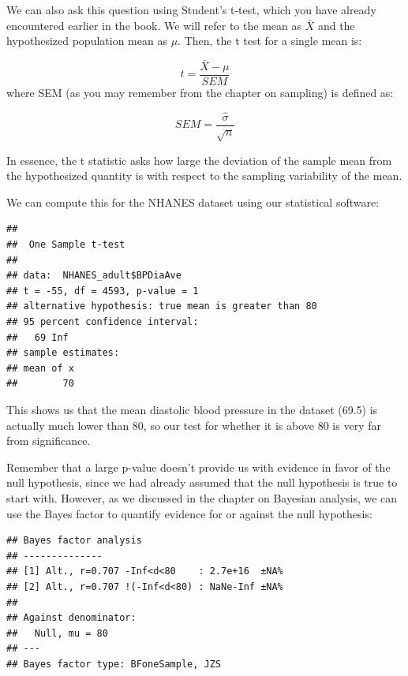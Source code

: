 \documentclass[
  12pt,
]{book}
\newenvironment{Shaded}{\begin{snugshade}}{\end{snugshade}}
\newcommand{\AttributeTok}[1]{\textcolor[rgb]{0.77,0.63,0.00}{#1}}
\newcommand{\ConstantTok}[1]{\textcolor[rgb]{0.00,0.00,0.00}{#1}}
\newcommand{\DecValTok}[1]{\textcolor[rgb]{0.00,0.00,0.81}{#1}}
\newcommand{\FunctionTok}[1]{\textcolor[rgb]{0.00,0.00,0.00}{#1}}
\newcommand{\NormalTok}[1]{#1}
\newcommand{\SpecialCharTok}[1]{\textcolor[rgb]{0.00,0.00,0.00}{#1}}
\begin{document}
We can also ask this question using Student's t-test, which you have already encountered earlier in the book. We will refer to the mean as \(\bar{X}\) and the hypothesized population mean as \(\mu\). Then, the t test for a single mean is:

\[
t = \frac{\bar{X} - \mu}{SEM}
\]
where SEM (as you may remember from the chapter on sampling) is defined as:

\[
SEM = \frac{\hat{\sigma}}{\sqrt{n}}
\]

In essence, the t statistic asks how large the deviation of the sample mean from the hypothesized quantity is with respect to the sampling variability of the mean.

We can compute this for the NHANES dataset using our statistical software:

\begin{verbatim}
## 
##  One Sample t-test
## 
## data:  NHANES_adult$BPDiaAve
## t = -55, df = 4593, p-value = 1
## alternative hypothesis: true mean is greater than 80
## 95 percent confidence interval:
##   69 Inf
## sample estimates:
## mean of x 
##        70
\end{verbatim}

This shows us that the mean diastolic blood pressure in the dataset (69.5) is actually much lower than 80, so our test for whether it is above 80 is very far from significance.

Remember that a large p-value doesn't provide us with evidence in favor of the null hypothesis, since we had already assumed that the null hypothesis is true to start with. However, as we discussed in the chapter on Bayesian analysis, we can use the Bayes factor to quantify evidence for or against the null hypothesis:

\begin{Shaded}
\end{Shaded}

\begin{verbatim}
## Bayes factor analysis
## --------------
## [1] Alt., r=0.707 -Inf<d<80    : 2.7e+16  ±NA%
## [2] Alt., r=0.707 !(-Inf<d<80) : NaNe-Inf ±NA%
## 
## Against denominator:
##   Null, mu = 80 
## ---
## Bayes factor type: BFoneSample, JZS
\end{verbatim}
\end{document}
